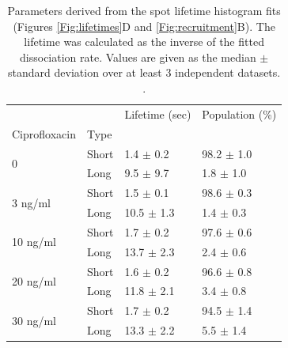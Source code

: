 \begin{table}[htbp]
    \centering
    \caption{Parameters derived from the spot lifetime histogram fits (Figures \ref{Fig:lifetimes}D and \ref{Fig:recruitment}B). The lifetime was calculated as the inverse of the fitted dissociation rate. Values are given as the median $\pm$ standard deviation over at least 3 independent datasets. . }
    \begin{tabular}{llll}
        \toprule
         &  & Lifetime (sec) & Population (\%) \\
        Ciprofloxacin & Type &  &  \\
        \midrule
        \multirow[t]{2}{*}{0} & Short & 1.4 $\pm$ 0.2 & 98.2 $\pm$ 1.0 \\
         & Long & 9.5 $\pm$ 9.7 & 1.8 $\pm$ 1.0 \\
        \cline{1-4}
        \multirow[t]{2}{*}{3 ng/ml} & Short & 1.5 $\pm$ 0.1 & 98.6 $\pm$ 0.3 \\
         & Long & 10.5 $\pm$ 1.3 & 1.4 $\pm$ 0.3 \\
        \cline{1-4}
        \multirow[t]{2}{*}{10 ng/ml} & Short & 1.7 $\pm$ 0.2 & 97.6 $\pm$ 0.6 \\
         & Long & 13.7 $\pm$ 2.3 & 2.4 $\pm$ 0.6 \\
        \cline{1-4}
        \multirow[t]{2}{*}{20 ng/ml} & Short & 1.6 $\pm$ 0.2 & 96.6 $\pm$ 0.8 \\
         & Long & 11.8 $\pm$ 2.1 & 3.4 $\pm$ 0.8 \\
        \cline{1-4}
        \multirow[t]{2}{*}{30 ng/ml} & Short & 1.7 $\pm$ 0.2 & 94.5 $\pm$ 1.4 \\
         & Long & 13.3 $\pm$ 2.2 & 5.5 $\pm$ 1.4 \\
        \cline{1-4}
        \bottomrule
        \end{tabular}
    \label{tab:fit_results}
\end{table}

